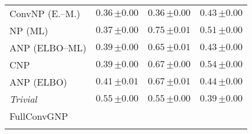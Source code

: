 \begin{tabular}[t]{lccc}
ConvNP (E.--M.) & $0.36\,{ \scriptstyle \pm  0.00 }$ & $0.36\,{ \scriptstyle \pm  0.00 }$ & $0.43\,{ \scriptstyle \pm  0.00 }$ \\ 
NP (ML) & $0.37\,{ \scriptstyle \pm  0.00 }$ & $0.75\,{ \scriptstyle \pm  0.01 }$ & $0.51\,{ \scriptstyle \pm  0.00 }$ \\ 
ANP (ELBO--ML) & $0.39\,{ \scriptstyle \pm  0.00 }$ & $0.65\,{ \scriptstyle \pm  0.01 }$ & $0.43\,{ \scriptstyle \pm  0.00 }$ \\ 
CNP & $0.39\,{ \scriptstyle \pm  0.00 }$ & $0.67\,{ \scriptstyle \pm  0.00 }$ & $0.54\,{ \scriptstyle \pm  0.00 }$ \\ 
ANP (ELBO) & $0.41\,{ \scriptstyle \pm  0.01 }$ & $0.67\,{ \scriptstyle \pm  0.01 }$ & $0.44\,{ \scriptstyle \pm  0.00 }$ \\ 
{\normalshape \textit{Trivial}} & $0.55\,{ \scriptstyle \pm  0.00 }$ & $0.55\,{ \scriptstyle \pm  0.00 }$ & $0.39\,{ \scriptstyle \pm  0.00 }$ \\ 
FullConvGNP &  &  &  \\ 
\bottomrule \\ 
\end{tabular} 
